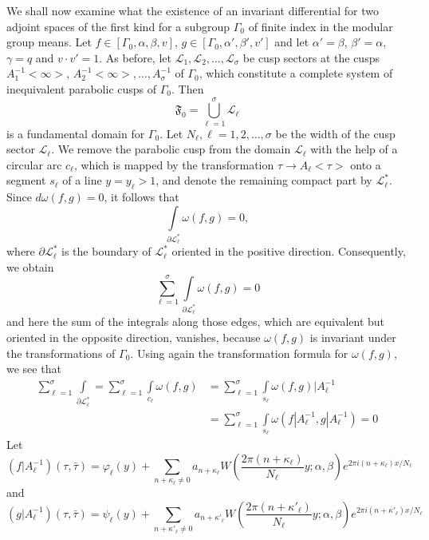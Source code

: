 We shall now examine what the existence of an invariant differential
for  two adjoint spaces of the first kind for a subgroup $\Gamma_0$ of
finite index in the modular group means. Let $f\in [\Gamma_0,
  \alpha, \beta, v]$, $g\in[\Gamma_0, \alpha',\beta',v']$ and
let $\alpha'=\beta$, $\beta'=\alpha$, $\gamma=q$ and $v\cdot v'=1$. As
before, let $\mathscr{L}_1, \mathscr{L}_2, \ldots,
\mathscr{L}_{\sigma}$ be cusp sectors at the cusps $A^{-1}_1<\infty>$,
$A^{-1}_2<\infty>, \ldots, A^{-1}_{\sigma}$ of $\Gamma_0$, which
constitute a complete system of inequivalent parabolic cusps of
$\Gamma_0$. Then
$$
\mathfrak{F}_0 = \bigcup^{\sigma}_{\ell=1} \mathscr{L}_{\ell}
$$
is a fundamental domain for $\Gamma_0$. Let
$N_{\ell},\ell=1,2,\ldots,\sigma$ be the width of the cusp sector
$\mathscr{L}_{\ell}$. We remove the parabolic cusp from the domain
$\mathscr{L}_{\ell}$ with the help of a circular arc $c_{\ell}$, which
is mapped by the transformation $\tau\to A_{\ell}<\tau>$ onto a
segment $s_{\ell}$ of a line $y=y_{\ell}>1$, and denote the remaining
compact part by $\mathscr{L}^{\ast}_{\ell}$. Since $d\omega(f,g)=0$,
it follows that 
$$
\int\limits_{\partial \mathscr{L}^{\ast}_{\ell}} \omega(f,g) = 0,
$$
where $\partial \mathscr{L}^{\ast}_{\ell}$ is the boundary of
$\mathscr{L}^{\ast}_{\ell}$ oriented in the positive
direction. Consequently, we obtain
$$
\sum^{\sigma}_{\ell=1} \int\limits_{\partial
  \mathscr{L}^{\ast}_{\ell}} \omega(f,g)=0
$$
and here the sum of the integrals along those edges, which are
equivalent but oriented in the opposite direction, vanishes, because
$\omega(f,g)$ is invariant \pageoriginale under the transformations of
$\Gamma_0$. Using again the transformation formula for
$\omega(f,g)$, we see that
\begin{align*}
\sum^{\sigma}_{\ell=1} \int\limits_{\partial
  \mathscr{L}^{\ast}_{\ell}} = \sum^{\sigma}_{\ell=1}
\int\limits_{c_{\ell}} \omega(f,g) & = \sum^{\sigma}_{\ell=1}
\int\limits_{s_{\ell}} \omega(f,g)|A^{-1}_{\ell}\\
& = \sum^{\sigma}_{\ell=1} \int\limits_{s_{\ell}}
\omega(f|A^{-1}_{\ell}, g|A^{-1}_{\ell}) =0 \tag{3}\label{c4:eq3:3}
\end{align*}
Let 
$$
(f|A^{-1}_{\ell}) (\tau,\bar{\tau}) = \varphi_{\ell}(y) +
\sum_{n+\kappa_{\ell}\neq 0} a_{n+\kappa_{\ell}} W
(\frac{2\pi(n+\kappa_{\ell})}{N_{\ell}} y; \alpha, \beta) e^{2\pi i
  (n+\kappa_{\ell})x/N_{\ell}} 
$$
and
$$
(g|A^{-1}_{\ell})(\tau,\bar{\tau}) = \psi_{\ell}(y) +
\sum_{n+\kappa'_{\ell} \neq 0} a_{n+\kappa'_{\ell}}
W(\frac{2\pi(n+\kappa'_{\ell})}{N_{\ell}}y;\alpha, \beta) e^{2\pi
  i(n+\kappa'_{\ell})x/N_{\ell}} 
$$
